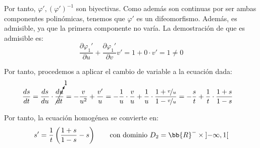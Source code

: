\begin{ejercicio}
    Por tanto, $\varphi', (\varphi')^{-1}$ son biyectivas. Como además son continuas por ser ambas componentes polinómicas, tenemos que $\varphi'$ es un difeomorfismo. Además, es admisible, ya que la primera componente no varía. La demostración de que es admisible es:
    \begin{equation*}
        \dfrac{\partial \varphi_1'}{\partial u} + \dfrac{\partial \varphi_1'}{\partial v} v' = 1 + 0\cdot v'=1 \neq 0
    \end{equation*}

    Por tanto, procedemos a aplicar el cambio de variable a la ecuación dada:
    \begin{align*}
        \dfrac{ds}{dt} &= \dfrac{ds}{du}\cdot \cancelto{1}{\dfrac{du}{dt}} = -\dfrac{v}{u^2} + \dfrac{v'}{u} = -\dfrac{1}{u}\cdot \dfrac{v}{u} + \dfrac{1}{u}\cdot \dfrac{1+\nicefrac{v}{u}}{1-\nicefrac{v}{u}} = -\dfrac{s}{t} + \dfrac{1}{t}\cdot \dfrac{1+s}{1-s} 
    \end{align*}

    Por tanto, la ecuación homogénea se convierte en:
    \begin{equation*}
        s' = \dfrac{1}{t}\left(\dfrac{1+s}{1-s} - s\right) \qquad \text{con dominio } D_2=\bb{R}^- \times \left]-\infty,1\right[
    \end{equation*}


\end{ejercicio}

